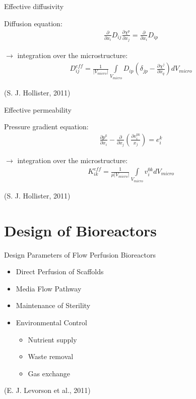 \documentclass[11pt,t]{beamer}
\newcommand{\Int}{\int\limits}
\begin{document}
\begin{frame}[fragile]{Effective diffusivity}
	
	Diffusion equation:
	\begin{gather*}
	\frac{\partial}{\partial x_i}D_{ij}\frac{\partial \chi^{p}}{\partial x_j} = \frac{\partial}{\partial x_i}D_{ip}
	\end{gather*}
	
	$\rightarrow$ integration over the microstructure:
	\begin{gather*}
	D^{eff}_{ij} = \frac{1}{|V_{micro}|}\Int_{V_{micro}} D_{ip} \left( \delta_{jp}   - \frac{\partial \chi^{j}}{\partial x_q} \right) dV_{micro}
	\end{gather*}

\vfill
\footnotesize(S. J. Hollister, 2011)
		
\end{frame}

\begin{frame}[fragile]{Effective permeability}
	
	Pressure gradient equation:
	\begin{gather*}
	\frac{\partial p^k}{\partial x_i}-\frac{\partial}{\partial x_j} \left( \frac{\partial v^{0k}_i}{x_j}   \right) = e^k_i
	\end{gather*}
	
	$\rightarrow$ integration over the microstructure:
	\begin{gather*}
	K^{eff}_{ik} = \frac{1}{\mu|V_{micro}|}\Int_{V_{micro}} v^{0k}_i dV_{micro}
	\end{gather*}

\vfill
\footnotesize(S. J. Hollister, 2011)
		
\end{frame}


\section{Design of Bioreactors}

\begin{frame}[fragile]{ Design Parameters of Flow Perfusion Bioreactors}

\begin{itemize}
\item
Direct Perfusion of Scaffolds
\item
Media Flow Pathway
\item
Maintenance of Sterility
\item
Environmental Control
\begin{itemize}
\item
Nutrient supply 
\item
Waste removal
\item
Gas exchange
\end{itemize}
\end{itemize}
	


\vfill
\footnotesize(E. J. Levorson et al., 2011)
		
\end{frame}
\end{document}
